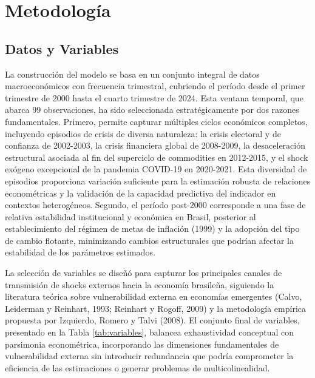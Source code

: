 \documentclass[3p,11pt]{elsarticle}
\begin{document}
\section{Metodología}

\subsection{Datos y Variables}

La construcción del modelo se basa en un conjunto integral de datos macroeconómicos con frecuencia trimestral, cubriendo el período desde el primer trimestre de 2000 hasta el cuarto trimestre de 2024. Esta ventana temporal, que abarca 99 observaciones, ha sido seleccionada estratégicamente por dos razones fundamentales. Primero, permite capturar múltiples ciclos económicos completos, incluyendo episodios de crisis de diversa naturaleza: la crisis electoral y de confianza de 2002-2003, la crisis financiera global de 2008-2009, la desaceleración estructural asociada al fin del superciclo de commodities en 2012-2015, y el shock exógeno excepcional de la pandemia COVID-19 en 2020-2021. Esta diversidad de episodios proporciona variación suficiente para la estimación robusta de relaciones econométricas y la validación de la capacidad predictiva del indicador en contextos heterogéneos. Segundo, el período post-2000 corresponde a una fase de relativa estabilidad institucional y económica en Brasil, posterior al establecimiento del régimen de metas de inflación (1999) y la adopción del tipo de cambio flotante, minimizando cambios estructurales que podrían afectar la estabilidad de los parámetros estimados.

La selección de variables se diseñó para capturar los principales canales de transmisión de shocks externos hacia la economía brasileña, siguiendo la literatura teórica sobre vulnerabilidad externa en economías emergentes (Calvo, Leiderman y Reinhart, 1993; Reinhart y Rogoff, 2009) y la metodología empírica propuesta por Izquierdo, Romero y Talvi (2008). El conjunto final de variables, presentado en la Tabla \ref{tab:variables}, balancea exhaustividad conceptual con parsimonia econométrica, incorporando las dimensiones fundamentales de vulnerabilidad externa sin introducir redundancia que podría comprometer la eficiencia de las estimaciones o generar problemas de multicolinealidad.
\end{document}
